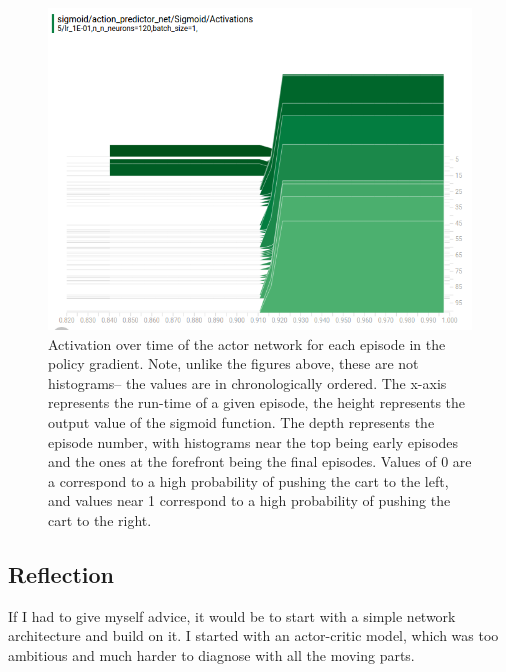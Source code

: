 \documentclass[12pt,a4paper]{article}
\begin{document}
\begin{figure}[htbp]
\begin{center}
\includegraphics[width=\linewidth]{pg_stuck.png}
\caption{Activation over time of the actor network for each episode in the policy gradient. Note, unlike the figures above, these are not histograms-- the values are in chronologically ordered. The x-axis represents the run-time of a given episode, the height represents the output value of the sigmoid function. The depth represents the episode number, with histograms near the top being early episodes and the ones at the forefront being the final episodes. Values of 0 are a correspond to a high probability of pushing the cart to the left, and values near 1 correspond to a high probability of pushing the cart to the right.}
\label{pg_stuck}
\end{center}
\end{figure}

\subsection*{Reflection}
If I had to give myself advice, it would be to start with a simple network architecture and build on it. I started with an actor-critic model, which was too ambitious and much harder to diagnose with all the moving parts. 
\end{document}
